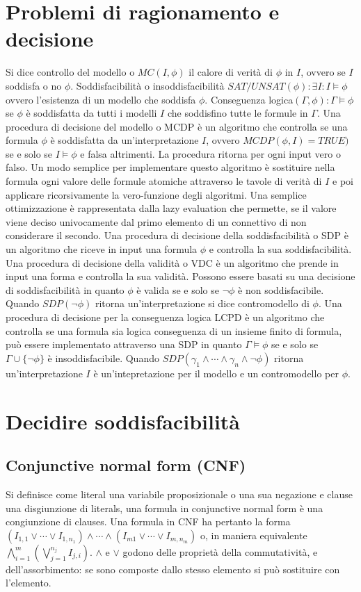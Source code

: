 \section{Problemi di ragionamento e decisione}
Si dice controllo del modello o $MC(I, \phi)$ il calore di verit\`a di $\phi$ in $I$, ovvero se $I$ soddisfa o no $\phi$. Soddisfacibilit\`a o insoddisfacibilit\`a $SAT/UNSAT(\phi): \exists I: I\models\phi$ ovvero
l'esistenza di un modello che soddisfa $\phi$.  Conseguenza logica$(\Gamma, \phi): \Gamma\models\phi$ se $\phi$ \`e soddisfatta da tutti i modelli $I$ che soddisfino tutte le formule in $\Gamma$. 
Una procedura di decisione del modello o MCDP \`e un algoritmo che controlla se una formula $\phi$ \`e soddisfatta da un'interpretazione $I$, ovvero $MCDP(\phi, I)=TRUE)$ se e solo se $I\models\phi$ e
falsa altrimenti. La procedura ritorna per ogni input vero o falso. Un modo semplice per implementare questo algoritmo \`e sostituire nella formula ogni valore delle formule atomiche attraverso le tavole di 
verit\`a di $I$ e poi applicare ricorsivamente la vero-funzione degli algoritmi. 	Una semplice ottimizzazione \`e rappresentata dalla lazy evaluation che permette, se il valore viene deciso univocamente dal primo
elemento di un connettivo di non considerare il secondo. Una procedura di decisione della soddisfacibilit\`a o SDP \`e un algoritmo che riceve in input una formula $\phi$ e controlla la sua soddisfacibilit\`a. 
Una procedura di decisione della validit\`a o VDC \`e un algoritmo che prende in input una forma e controlla la sua validit\`a. Possono essere basati su una decisione di soddisfacibilit\`a in quanto $\phi$ \`e
valida se e solo se $\neg\phi$ \`e non soddisfacibile. Quando $SDP(\neg\phi)$ ritorna un'interpretazione si dice contromodello di $\phi$. Una procedura di decisione per la conseguenza logica LCPD \`e
un algoritmo che controlla se una formula sia logica conseguenza di un insieme finito di formula, pu\`o essere implementato attraverso una SDP in quanto $\Gamma\models\phi$ se e solo se $\Gamma\cup
\{\neg\phi\}$ \`e insoddisfacibile. Quando $SDP(\gamma_1\land\cdots\land\gamma_n\land\neg\phi)$ ritorna un'interpretazione $I$ \`e un'intepretazione per il modello e un contromodello per $\phi$.
\section{Decidire soddisfacibilit\`a}
\subsection{Conjunctive normal form (CNF)}
Si definisce come literal una variabile proposizionale o una sua negazione e clause una disgiunzione di literals, una formula in conjunctive normal form \`e una congiunzione di clauses. Una formula in CNF ha
pertanto la forma $(I_{1,1}\lor\cdots\lor I_{1, n_1})\land\cdots\land(I_{m1}\lor\cdots\lor I_{m,n_m})$ o, in maniera equivalente $\bigwedge\limits_{i=1}^m(\bigvee\limits_{j=1}^{n_j}I_{j, i})$. $\land$ e 
$\lor$ godono delle propriet\`a della commutativit\`a, e dell'assorbimento: se sono composte dallo stesso elemento si pu\`o sostituire con l'elemento. 
